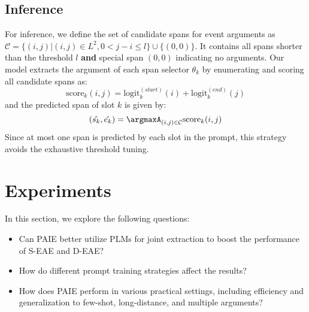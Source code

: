 \subsection{Inference}
For inference, we define the set of candidate spans for event arguments as $\mathcal{C}=\{(i, j)|(i,j) \in L^2, 0<j-i \leq l\} \cup \{(0, 0)\}$. It contains all spans shorter than the threshold $l$ \textbf{and} special span $(0, 0)$ indicating no arguments. Our model extracts the argument of each span selector $\theta_k$ by enumerating and scoring all candidate spans as:
\begin{equation}
 \text{score}_k(i, j) = \text{logit}_{k}^{(start)}(i) + \text{logit}_{k}^{(end)}(j)
\end{equation}
and the predicted span of slot $k$ is given by:
\begin{equation}
    (\hat{s_k}, \hat{e_k}) = \argmaxA_{(i, j) \in \mathcal{C}} \text{score}_k(i, j)
\end{equation}
Since at most one span is predicted by each slot in the prompt, this strategy avoids the exhaustive threshold tuning.\section{Experiments}

In this section, we explore the following questions:

\begin{itemize}[leftmargin=*]
    \setlength{\parskip}{0pt}
   \setlength{\itemsep}{0pt plus 1pt}
    \item Can PAIE better utilize PLMs for joint extraction to boost the performance of S-EAE and D-EAE?
    \item How do different prompt training strategies affect the results?
    \item How does PAIE perform in various practical settings, including efficiency and generalization to few-shot, long-distance, and multiple arguments?
\end{itemize}

